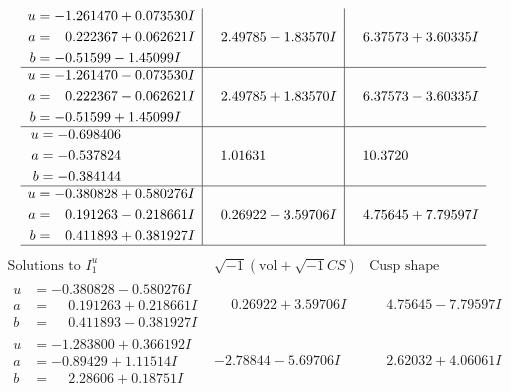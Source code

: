 \documentclass[1p]{elsarticle_modified}
\theoremstyle{definition}
\newcommand{\I}{\sqrt{-1}}
\begin{document}
$$\begin{array}{c|c|c}
\begin{aligned}
u &= -1.261470 + 0.073530 I \\
a &= \phantom{-}0.222367 + 0.062621 I \\
b &= -0.51599 - 1.45099 I\end{aligned}
 & \phantom{-}2.49785 - 1.83570 I & \phantom{-}6.37573 + 3.60335 I \\ \hline\begin{aligned}
u &= -1.261470 - 0.073530 I \\
a &= \phantom{-}0.222367 - 0.062621 I \\
b &= -0.51599 + 1.45099 I\end{aligned}
 & \phantom{-}2.49785 + 1.83570 I & \phantom{-}6.37573 - 3.60335 I \\ \hline\begin{aligned}
u &= -0.698406\phantom{ +0.000000I} \\
a &= -0.537824\phantom{ +0.000000I} \\
b &= -0.384144\phantom{ +0.000000I}\end{aligned}
 & \phantom{-}1.01631\phantom{ +0.000000I} & \phantom{-}10.3720\phantom{ +0.000000I} \\ \hline\begin{aligned}
u &= -0.380828 + 0.580276 I \\
a &= \phantom{-}0.191263 - 0.218661 I \\
b &= \phantom{-}0.411893 + 0.381927 I\end{aligned}
 & \phantom{-}0.26922 - 3.59706 I & \phantom{-}4.75645 + 7.79597 I\\
 \hline 
 \end{array}$$\newpage$$\begin{array}{c|c|c}  
\text{Solutions to }I^u_{1}& \I (\text{vol} + \sqrt{-1}CS) & \text{Cusp shape}\\
 \hline 
\begin{aligned}
u &= -0.380828 - 0.580276 I \\
a &= \phantom{-}0.191263 + 0.218661 I \\
b &= \phantom{-}0.411893 - 0.381927 I\end{aligned}
 & \phantom{-}0.26922 + 3.59706 I & \phantom{-}4.75645 - 7.79597 I \\ \hline\begin{aligned}
u &= -1.283800 + 0.366192 I \\
a &= -0.89429 + 1.11514 I \\
b &= \phantom{-}2.28606 + 0.18751 I\end{aligned}
 & -2.78844 - 5.69706 I & \phantom{-}2.62032 + 4.06061 I \\ \hline\begin{aligned}

\end{aligned}
\end{array}$$
\end{document}

